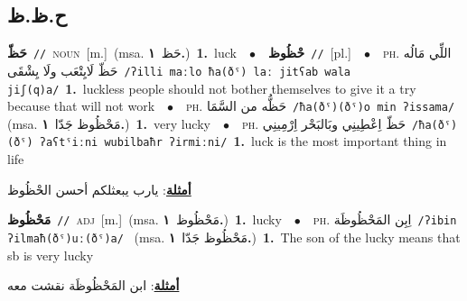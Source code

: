 \documentclass[10pt,a4paper,twoside]{article} %
\begin{document}
\begin{multicols}{2}
\vspace{-3mm}
\subsection*{\color{blue}\foreignlanguage{arabic}{ح.ظ.ظ}\color{blue}{}} 

{\setlength\topsep{0pt}\textbf{\foreignlanguage{arabic}{حَظّ}}\ {\color{gray}\texttt{//}\color{black}}\ \textsc{noun}\ [m.]\ \color{gray}(msa. \foreignlanguage{arabic}{حَظ}~\foreignlanguage{arabic}{\textbf{١.}})\color{black}\ \textbf{1.}~luck\ \ $\bullet$\ \ \setlength\topsep{0pt}\textbf{\foreignlanguage{arabic}{حْظُوظ}}\ {\color{gray}\texttt{//}\color{black}}\ [pl.]\ \ $\bullet$\ \ \textsc{ph.} \color{gray} \foreignlanguage{arabic}{اللِّي مَالُه حَظّ لَايِتْعَب ولَا يِشْقَى}\color{black}\ {\color{gray}\texttt{/{\sffamily ʔilli maːlo ħa(ðˤ) laː jitʕab wala jiʃ(q)a}/}\color{black}}\ \textbf{1.}~luckless people should not bother themselves to give it a try because that will not work\ \ $\bullet$\ \ \textsc{ph.} \color{gray} \foreignlanguage{arabic}{حَظُّه من السَّمَا}\color{black}\ {\color{gray}\texttt{/{\sffamily ħa(ðˤ)(ðˤ)o min ʔissama}/}\color{black}}\ \color{gray} (msa. \foreignlanguage{arabic}{مَحْظُوظ جَدّا}~\foreignlanguage{arabic}{\textbf{١.}})\color{black}\ \textbf{1.}~very lucky\ \ $\bullet$\ \ \textsc{ph.} \color{gray} \foreignlanguage{arabic}{حَظّ اِعْطِينِي وبَالبَحْر اِرْمِينِي}\color{black}\ {\color{gray}\texttt{/{\sffamily ħa(ðˤ)(ðˤ) ʔaʕtˤiːni wubilbaħr ʔirmiːni}/}\color{black}}\ \textbf{1.}~luck is the most important thing in life\  \begin{flushright}\color{gray}\foreignlanguage{arabic}{\textbf{\underline{\foreignlanguage{arabic}{أمثلة}}}: يارب يبعثلكم أحسن الحْظُوظ}\end{flushright}\color{black}} \vspace{2mm}

{\setlength\topsep{0pt}\textbf{\foreignlanguage{arabic}{مَحْظُوظ}}\ {\color{gray}\texttt{//}\color{black}}\ \textsc{adj}\ [m.]\ \color{gray}(msa. \foreignlanguage{arabic}{مَحْظُوظ}~\foreignlanguage{arabic}{\textbf{١.}})\color{black}\ \textbf{1.}~lucky\ \ $\bullet$\ \ \textsc{ph.} \color{gray} \foreignlanguage{arabic}{اِبِن المَحْظُوظَة}\color{black}\ {\color{gray}\texttt{/{\sffamily ʔibin ʔilmaħ(ðˤ)uː(ðˤ)a}/}\color{black}}\ \color{gray} (msa. \foreignlanguage{arabic}{مَحْظُوظ جَدّا}~\foreignlanguage{arabic}{\textbf{١.}})\color{black}\ \textbf{1.}~The son of the lucky means that sb is very lucky\  \begin{flushright}\color{gray}\foreignlanguage{arabic}{\textbf{\underline{\foreignlanguage{arabic}{أمثلة}}}: ابن المَحْظُوظَة نقشت معه}\end{flushright}\color{black}} \vspace{2mm}


\end{multicols}
\end{document}
